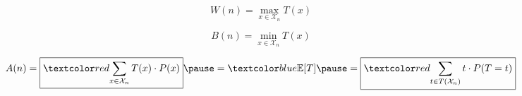 
\begin{frame}{}
\end{frame}

\begin{frame}{}
  \begin{center}
    {\large {}} \\[8pt] \pause
    {\large {}}
  \end{center}

  \pause
  \[
    W(n) = \max_{x \in \mathcal{X}_{n}} T(x)
  \]

  \pause
  \[
    B(n) = \min_{x \in \mathcal{X}_{n}} T(x)
  \]

  \pause
  \[
	A(n) = \boxed{\red{\sum_{x \in \mathcal{X}_{n}} T(x) \cdot P(x)}} \pause 
	     = \blue{\mathbb{E} [T]} \pause 
		 = \boxed{\red{\sum_{t \in T(\mathcal{X}_{n})} t \cdot P(T = t)}}
  \]
\end{frame}

